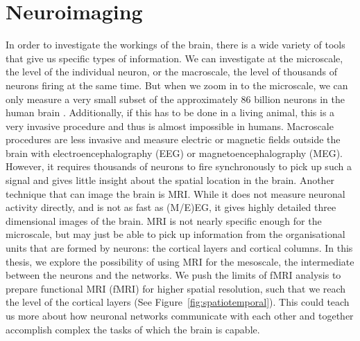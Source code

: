 \section*{Neuroimaging}
In order to investigate the workings of the brain, there is a wide variety of tools that give us specific types of information. We can investigate at the microscale, the level of the individual neuron, or the macroscale, the level of thousands of neurons firing at the same time. But when we zoom in to the microscale, we can only measure a very small subset of the approximately 86 billion neurons in the human brain \cite{Herculano-Houzel2009}. Additionally, if this has to be done in a living animal, this is a very invasive procedure and thus is almost impossible in humans. Macroscale procedures are less invasive and measure electric or magnetic fields outside the brain with electroencephalography (EEG) or magnetoencephalography (MEG). However, it requires thousands of neurons to fire synchronously to pick up such a signal and gives little insight about the spatial location in the brain. Another technique that can image the brain is MRI. While it does not measure neuronal activity directly, and is not as fast as (M/E)EG, it gives highly detailed three dimensional images of the brain. MRI is not nearly specific enough for the microscale, but may just be able to pick up information from the organisational units that are formed by neurons: the cortical layers and cortical columns. In this thesis, we explore the possibility of using MRI for the mesoscale, the intermediate between the neurons and the networks. We push the limits of fMRI analysis to prepare functional MRI (fMRI) for higher spatial resolution, such that we reach the level of the cortical layers (See Figure~\ref{fig:spatiotemporal}). This could teach us more about how neuronal networks communicate with each other and together accomplish complex the tasks of which the brain is capable.


